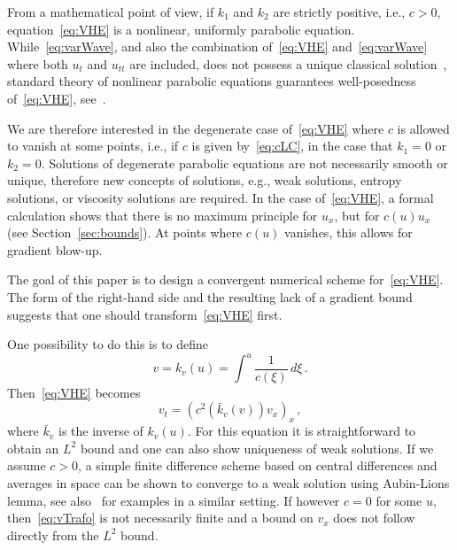 \documentclass[11pt,leqno]{amsart}
\newcommand{\pt}[1]{#1_t}
\newcommand{\ptt}[1]{#1_{tt}}
\newcommand{\px}[1]{#1_x }
\newcommand{\pxx}[1]{#1_{xx}}
\newcommand{\pxxx}[1]{#1_{xxx}}
\newcommand{\ptx}[1]{#1_{tx}}
\begin{document}
From a mathematical point of view, if $k_1$ and $k_2$ are strictly positive, i.e., $c>0$, equation~\eqref{eq:VHE} is a nonlinear, uniformly parabolic equation. While~\eqref{eq:varWave}, and also the combination of~\eqref{eq:VHE} and~\eqref{eq:varWave} where both $\pt{u}$ and $\ptt{u}$ are included, does not possess a unique classical solution~\cite{GlasseyHunterZheng1996,BressanZheng2006,ChenZheng2013}, standard theory of nonlinear parabolic equations guarantees well-posedness of~\eqref{eq:VHE}, see~\cite{Ladyzhenskaya-book1968}.

We are therefore interested in the degenerate case of~\eqref{eq:VHE} where $c$ is allowed to vanish at some points, i.e., if $c$ is given by~\eqref{eq:cLC}, in the case that $k_1=0$ or $k_2=0$. Solutions of degenerate parabolic equations are not necessarily smooth or unique, therefore new concepts of solutions, e.g., weak solutions, entropy solutions, or viscosity solutions are required.
In the case of~\eqref{eq:VHE}, a formal calculation shows that there is no maximum principle for $\px{u}$, but for $c(u)\px{u}$ (see Section~\ref{sec:bounds}). 
At points where $c(u)$ vanishes, this allows for gradient blow-up.

The goal of this paper is to design a convergent numerical scheme for~\eqref{eq:VHE}. The form of the right-hand side and the resulting lack of a gradient bound suggests that one should transform~\eqref{eq:VHE} first. %

One possibility to do this is to define
\begin{equation}\label{eq:vTrafo}
  v=k_v(u)=\int^u \frac{1}{c(\xi)} \,d\xi\,.
\end{equation}
Then~\eqref{eq:VHE} becomes
\begin{equation}\label{eq:v}
  \pt{v}=\px{(c^2(\bar{k}_v(v)) \px{v})}\,,
\end{equation}
where $\bar{k}_v$ is the inverse of $k_v(u)$. For this equation it is straightforward to obtain an $L^2$ bound and one can also show uniqueness of weak solutions. If we assume $c>0$, a simple finite difference scheme based on central differences and averages in space can be shown to converge to a weak solution using Aubin-Lions lemma, see also~\cite{Ladyzhenskaya-book1985, Samarskii-book2001} for examples in a similar setting. If however $c=0$ for some $u$, then~\eqref{eq:vTrafo} is not necessarily finite and a bound on $\px{v}$  does not follow directly from the $L^2$ bound. 
\end{document}
